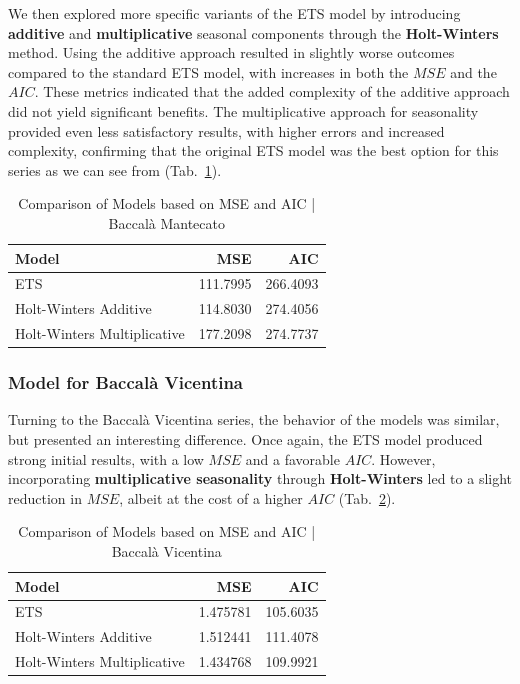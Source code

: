 \documentclass[10pt,twocolumn,letterpaper]{article}
\begin{document}
We then explored more specific variants of the ETS model by introducing \textbf{additive} and \textbf{multiplicative} seasonal components through the\textbf{ Holt-Winters} method. Using the additive approach resulted in slightly worse outcomes compared to the standard ETS model, with increases in both the $MSE$ and the $AIC$. These metrics indicated that the added complexity of the additive approach did not yield significant benefits. The multiplicative approach for seasonality provided even less satisfactory results, with higher errors and increased complexity, confirming that the original ETS model was the best option for this series as we can see from (Tab.~\ref{table:model_comparison_man}).

\begin{table}[h!]
\centering
\begin{tabular}{|l|r|r|}
\hline
\textbf{Model} & \textbf{MSE} & \textbf{AIC} \\
\hline
ETS & 111.7995 & 266.4093 \\
Holt-Winters Additive & 114.8030 & 274.4056 \\
Holt-Winters Multiplicative & 177.2098 & 274.7737 \\
\hline
\end{tabular}
\caption{Comparison of Models based on MSE and AIC | Baccalà Mantecato}
\label{table:model_comparison_man}
\end{table}

\subsubsection{Model for Baccalà Vicentina}
Turning to the Baccalà Vicentina series, the behavior of the models was similar, but presented an interesting difference. Once again, the ETS model produced strong initial results, with a low $MSE$ and a favorable $AIC$. However, incorporating \textbf{multiplicative seasonality} through \textbf{Holt-Winters} led to a slight reduction in $MSE$, albeit at the cost of a higher $AIC$ (Tab.~\ref{table:model_comparison_vic}).

\begin{table}[h!]
\centering
\begin{tabular}{|l|r|r|}
\hline
\textbf{Model} & \textbf{MSE} & \textbf{AIC} \\
\hline
ETS & 1.475781 & 105.6035 \\
Holt-Winters Additive & 1.512441 & 111.4078 \\
Holt-Winters Multiplicative & 1.434768 & 109.9921 \\
\hline
\end{tabular}
\caption{Comparison of Models based on MSE and AIC | Baccalà Vicentina}
\label{table:model_comparison_vic}
\end{table}
\end{document}
